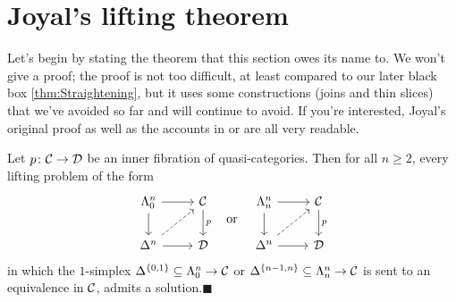 \section{Joyal's lifting theorem}\label{sec:JoyalLifting}
Let's begin by stating the theorem that this section owes its name to. We won't give a proof; the proof is not too difficult, at least compared to our later black box \cref{thm:Straightening}, but it uses some constructions (joins and thin slices) that we've avoided so far and will continue to avoid. If you're interested, Joyal's original proof \cite[Theorem~\href{https://people.math.rochester.edu/faculty/doug/otherpapers/Joyal-QCKC.pdf\#page=5}{2.2}]{JoyalLifting} as well as the accounts in \cite[Theorem~2.1.8]{Land} or \cite[Tag~\href{https://kerodon.net/tag/01H0}{01H0}]{Kerodon} are all very readable.
\begin{thm}\label{thm:JoyalLifting}
	Let $p\colon \mathcal{C}\rightarrow \mathcal{D}$ be an inner fibration of quasi-categories. Then for all $n\geqslant 2$, every lifting problem of the form
	\begin{equation*}
		\begin{tikzcd}
			\Lambda_0^n\rar\dar & \Cc\dar["p"]\\
			\Delta^n\rar\urar[dashed] & \Dd
		\end{tikzcd}\quad\text{or}\quad
		\begin{tikzcd}
			\Lambda_n^n\rar\dar & \Cc\dar["p"]\\
			\Delta^n\rar\urar[dashed] & \Dd
		\end{tikzcd}
	\end{equation*}
	in which the $1$-simplex $\Delta^{\{0,1\}}\subseteq \Lambda_0^n\rightarrow\mathcal{C}$ or $\Delta^{\{n-1,n\}}\subseteq \Lambda_n^n\rightarrow\mathcal{C}$ is sent to an equivalence in $\mathcal{C}$, admits a solution.\hfill$\blacksquare$
\end{thm}

